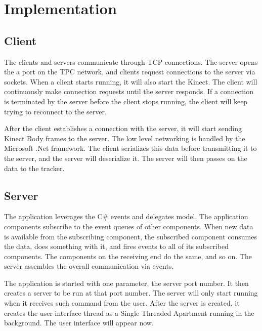 


\chapter{Implementation}

\label{chapter:Implementation}

\section{Client}
\label{sec:implementation_client}

The clients and servers communicate through TCP connections. The server opens the a port on the TPC network, and clients request connections to the server via sockets. When a client starts running, it will also start the Kinect. The client will continuously make connection requests until the server responds. If a connection is terminated by the server before the client stops running, the client will keep trying to reconnect to the server.

After the client establishes a connection with the server, it will start sending Kinect Body frames to the server. The low level networking is handled by the Microsoft .Net framework. The client serializes this data before transmitting it to the server, and the server will deserialize it. The server will then passes on the data to the tracker.

\section{Server}
\label{sec:implementation_server}

The application leverages the C\# events and delegates model. The application components subscribe to the event queues of other components. When new data is available from the subscribing component, the subscribed component consumes the data, does something with it, and fires events to all of its subscribed components. The components on the receiving end do the same, and so on. The server assembles the overall communication via events.

The application is started with one parameter, the server port number. It then creates a server to be run at that port number. The server will only start running when it receives such command from the user. After the server is created, it creates the user interface thread as a Single Threaded Apartment running in the background. The user interface will appear now.

